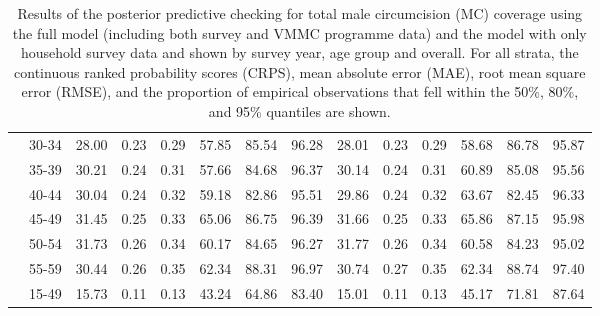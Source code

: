 \documentclass{article}
\begin{document}
\begin{appendix}
\begin{landscape}
{\begin{table}[H]
\begin{tabular}{ll ccc ccc ccc ccc}
    & 30-34 &  28.00 & 0.23 & 0.29 & 57.85 & 85.54 & 96.28 &  28.01 & 0.23 & 0.29 & 58.68 & 86.78 &  95.87 \\ 
    & 35-39 &  30.21 & 0.24 & 0.31 & 57.66 & 84.68 & 96.37 &  30.14 & 0.24 & 0.31 & 60.89 & 85.08 &  95.56 \\ 
    & 40-44 &  30.04 & 0.24 & 0.32 & 59.18 & 82.86 & 95.51 &  29.86 & 0.24 & 0.32 & 63.67 & 82.45 &  96.33 \\ 
    & 45-49 &  31.45 & 0.25 & 0.33 & 65.06 & 86.75 & 96.39 &  31.66 & 0.25 & 0.33 & 65.86 & 87.15 &  95.98 \\ 
    & 50-54 &  31.73 & 0.26 & 0.34 & 60.17 & 84.65 & 96.27 &  31.77 & 0.26 & 0.34 & 60.58 & 84.23 &  95.02 \\ 
    & 55-59 &  30.44 & 0.26 & 0.35 & 62.34 & 88.31 & 96.97 &  30.74 & 0.27 & 0.35 & 62.34 & 88.74 &  97.40 \\ 
    & 15-49 &  15.73 & 0.11 & 0.13 & 43.24 & 64.86 & 83.40 &  15.01 & 0.11 & 0.13 & 45.17 & 71.81 &  87.64 \\[5pt]
    \hline
    \end{tabular}
    \caption{Results of the posterior predictive checking for total male circumcision (MC) coverage using the full model (including both survey and VMMC programme data) and the model with only household survey data and shown by survey year, age group and overall. For all strata, the  continuous ranked probability scores (CRPS), mean absolute error (MAE), root mean square error (RMSE), and the proportion of empirical observations that fell within the 50\%, 80\%, and 95\% quantiles are shown.}
\end{table}}


\end{landscape}
\end{appendix}
\end{document}
